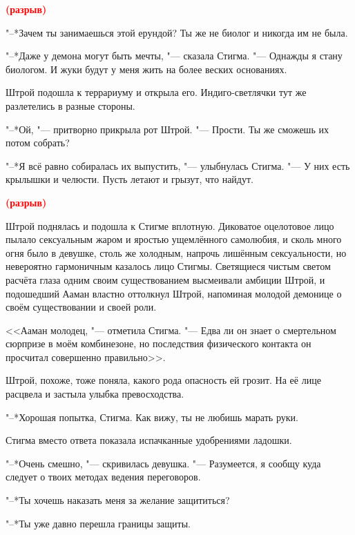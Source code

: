 \documentclass[a4paper,10pt,fleqn]{book}
\newcommand{\mulang}[3]{#2}%
\newcommand{\spacing}{\textcolor{red}{\textbf{(разрыв)}}}
\begin{document}
\spacing

"--*Зачем ты занимаешься этой ерундой?
Ты же не биолог и никогда им не была.

"--*Даже у демона могут быть мечты, "--- сказала Стигма.
"--- Однажды я стану биологом.
И жуки будут у меня жить на более веских основаниях.

Штрой подошла к террариуму и открыла его.
Индиго-светлячки тут же разлетелись в разные стороны.

"--*Ой, "--- притворно прикрыла рот Штрой.
"--- Прости.
Ты же сможешь их потом собрать?

"--*Я всё равно собиралась их выпустить, "--- улыбнулась Стигма.
"--- У них есть крылышки и челюсти.
Пусть летают и грызут, что найдут.

\spacing

Штрой поднялась и подошла к Стигме вплотную.
Диковатое оцелотовое лицо пылало сексуальным жаром и яростью ущемлённого самолюбия, и сколь много огня было в девушке, столь же холодным, напрочь лишённым сексуальности, но невероятно гармоничным казалось лицо Стигмы.
Светящиеся чистым светом расчёта глаза одним своим существованием высмеивали амбиции Штрой, и подошедший Ааман властно оттолкнул Штрой, напоминая молодой демонице о своём существовании и своей роли.

<<Ааман молодец, "--- отметила Стигма.
\mulang{}{"--- Едва ли он знает о смертельном сюрпризе в моём комбинезоне, но последствия физического контакта он просчитал совершенно правильно>>.}
{``He hardly know of the deadly surprise I've got in my suit, but he correctly predicted consequences of physical contact.''}

Штрой, похоже, тоже поняла, какого рода опасность ей грозит.
На её лице расцвела и застыла улыбка превосходства.

\mulang{}{"--*Хорошая попытка, Стигма.}
{``Nice try, Stijma.}
\mulang{}{Как вижу, ты не любишь марать руки.}
{You don't like to get your hands dirty, I guess.''}

Стигма вместо ответа показала испачканные удобрениями ладошки.

\mulang{}{"--*Очень смешно, "--- скривилась девушка.}
{``Very funny,'' the girl made a face.}
\mulang{}{"--- Разумеется, я сообщу куда следует о твоих методах ведения переговоров.}
{``Of course I'll report about your negotiation techniques.''}

"--*Ты хочешь наказать меня за желание защититься?

"--*Ты уже давно перешла границы защиты.
\end{document}
